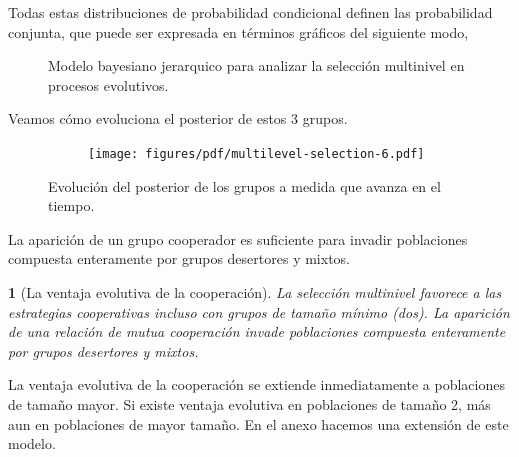 \documentclass[a4paper,10pt]{article}
\newif\ifen
\newif\ifes
\newcommand{\en}[1]{\ifen#1\fi}
\newcommand{\es}[1]{\ifes#1\fi}
\newtheorem{conclution}{\en{Conclution}\es{Conclusión}}%
\begin{document}
Todas estas distribuciones de probabilidad condicional definen las probabilidad conjunta, que puede ser expresada en términos gráficos del siguiente modo,
%
\begin{figure}[H]
\centering
{}
\caption{
Modelo bayesiano jerarquico para analizar la selección multinivel en procesos evolutivos.
}
\label{fig:modelo_grafico}
\end{figure}
%
Veamos cómo evoluciona el posterior de estos 3 grupos.
%
\begin{figure}[H]
    \centering
    \begin{subfigure}[b]{0.66\textwidth}
    \texttt{[image: figures/pdf/multilevel-selection-6.pdf]}
    \end{subfigure}
    \caption{
    Evolución del posterior de los grupos a medida que avanza en el tiempo.
    }
    \label{fig:multilevel-selection-6}
\end{figure}
%
La aparición de un grupo cooperador es suficiente para invadir poblaciones compuesta enteramente por grupos desertores y mixtos.
%
\begin{conclution}[La ventaja evolutiva de la cooperación]
La selección multinivel favorece a las estrategias cooperativas incluso con grupos de tamaño mínimo (dos).
La aparición de una relación de mutua cooperación invade poblaciones compuesta enteramente por grupos desertores y mixtos.
\end{conclution}
%
La ventaja evolutiva de la cooperación se extiende inmediatamente a poblaciones de tamaño mayor.
Si existe ventaja evolutiva en poblaciones de tamaño 2, más aun en poblaciones de mayor tamaño.
En el anexo hacemos una extensión de este modelo.
\end{document}
